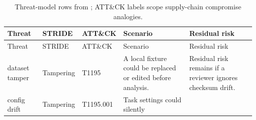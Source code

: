 \documentclass[
]{article}
\begin{document}
\begin{longtable}[]{@{}
  >{\raggedright\arraybackslash}p{}
  >{\raggedright\arraybackslash}p{}
  >{\raggedright\arraybackslash}p{}
  >{\raggedright\arraybackslash}p{}
  >{\raggedright\arraybackslash}p{}@{}}
\caption{Threat-model rows from
\protect{}; ATT\&CK
labels scope supply-chain compromise
analogies.}\label{tbl:security-threat-model}\tabularnewline
\toprule\noalign{}
\begin{minipage}[b]{\linewidth}\raggedright
Threat
\end{minipage} & \begin{minipage}[b]{\linewidth}\raggedright
STRIDE
\end{minipage} & \begin{minipage}[b]{\linewidth}\raggedright
ATT\&CK
\end{minipage} & \begin{minipage}[b]{\linewidth}\raggedright
Scenario
\end{minipage} & \begin{minipage}[b]{\linewidth}\raggedright
Residual risk
\end{minipage} \\
\midrule\noalign{}
\endfirsthead
\toprule\noalign{}
\begin{minipage}[b]{\linewidth}\raggedright
Threat
\end{minipage} & \begin{minipage}[b]{\linewidth}\raggedright
STRIDE
\end{minipage} & \begin{minipage}[b]{\linewidth}\raggedright
ATT\&CK
\end{minipage} & \begin{minipage}[b]{\linewidth}\raggedright
Scenario
\end{minipage} & \begin{minipage}[b]{\linewidth}\raggedright
Residual risk
\end{minipage} \\
\midrule\noalign{}
\endhead
\bottomrule\noalign{}
\endlastfoot
dataset tamper & Tampering & T1195 & A local fixture could be replaced
or edited before analysis. & Residual risk remains if a reviewer ignores
checksum drift. \\
config drift & Tampering & T1195.001 & Task settings could silently

\end{longtable}
\end{document}
